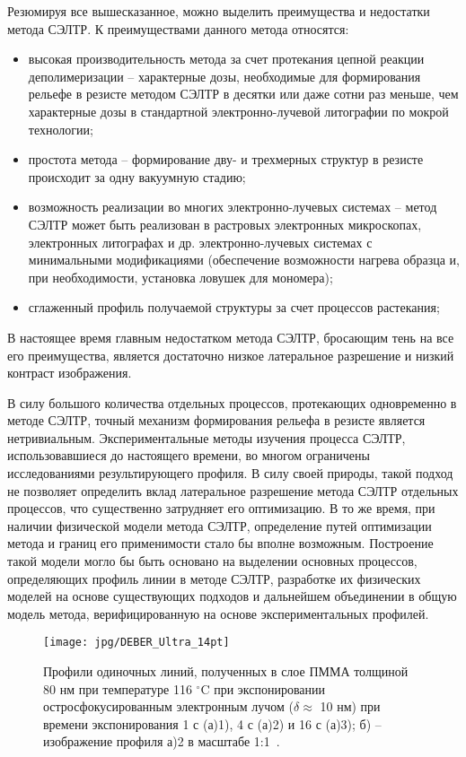 Резюмируя все вышесказанное, можно выделить преимущества и недостатки метода СЭЛТР. К преимуществами данного метода относятся:
\begin{itemize}
	\item высокая производительность метода за счет протекания цепной реакции деполимеризации -- характерные дозы, необходимые для формирования рельефе в резисте методом СЭЛТР в десятки или даже сотни раз меньше, чем характерные дозы в стандартной электронно-лучевой литографии по \textquotedbl мокрой\textquotedbl{} технологии;
	\item простота метода -- формирование дву- и трехмерных структур в резисте происходит за одну вакуумную стадию;
	\item возможность реализации во многих электронно-лучевых системах -- метод СЭЛТР может быть реализован в растровых электронных микроскопах, электронных литографах и др. электронно-лучевых системах с минимальными модификациями (обеспечение возможности нагрева образца и, при необходимости, установка ловушек для мономера);
	\item сглаженный профиль получаемой структуры за счет процессов растекания;
\end{itemize}

В настоящее время главным недостатком метода СЭЛТР, бросающим тень на все его преимущества, является достаточно низкое латеральное разрешение и низкий контраст изображения.

В силу большого количества отдельных процессов, протекающих одновременно в методе СЭЛТР, точный механизм формирования рельефа в резисте является нетривиальным. Экспериментальные методы изучения процесса СЭЛТР, использовавшиеся до настоящего времени, во многом ограничены исследованиями результирующего профиля. В силу своей природы, такой подход не позволяет определить вклад латеральное разрешение метода СЭЛТР отдельных процессов, что существенно затрудняет его оптимизацию. В то же время, при наличии физической модели метода СЭЛТР, определение путей оптимизации метода и границ его применимости стало бы вполне возможным. Построение такой модели могло бы быть основано на выделении основных процессов, определяющих профиль линии в методе СЭЛТР, разработке их физических моделей на основе существующих подходов и дальнейшем объединении в общую модель метода, верифицированную на основе экспериментальных профилей.

\begin{figure}
	\centering
	\texttt{[image: jpg/DEBER\_Ultra\_14pt]}
	\caption{Профили одиночных линий, полученных в слое ПММА толщиной 80 нм при температуре 116 $^\circ$C при экспонировании остросфокусированным электронным лучом ($\delta \approx$ 10 нм) при времени экспонирования 1 с (а)1), 4 с (а)2) и 16 с (а)3); б) -- изображение профиля а)2 в масштабе 1:1~\cite{Bruk_2016_mee}.}
	\label{fig:DEBER_Ultra}
\end{figure}

